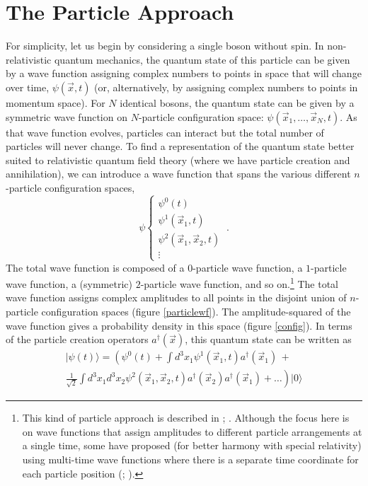 \documentclass[12pt,onecolumn,secnumarabic,amsmath,amssymb,balancelastpage,nofootinbib]{article}
\begin{document}
\section{The Particle Approach}\label{PARTICLEsection}

For simplicity, let us begin by considering a single boson without spin.  In non-relativistic quantum mechanics, the quantum state of this particle can be given by a wave function assigning complex numbers to points in space that will change over time, $\psi(\vec{x}, t)$ (or, alternatively, by assigning complex numbers to points in momentum space).  For $N$ identical bosons, the quantum state can be given by a symmetric wave function on $N$-particle configuration space: $\psi(\vec{x}_1, \dots, \vec{x}_N, t)$.  As that wave function evolves, particles can interact but the total number of particles will never change.  To find a representation of the quantum state better suited to relativistic quantum field theory (where we have particle creation and annihilation), we can introduce a wave function that spans the various different $n$-particle configuration spaces,
\begin{equation}
\psi \left\{ \begin{matrix}
\psi^{0}(t) \\
\psi^{1}(\vec{x}_1,t) \\
\psi^{2}(\vec{x}_1,\vec{x}_2,t) \\
\vdots
\end{matrix}
\right.\ .
\label{totalWFscalar}
\end{equation}
The total wave function is composed of a $0$-particle wave function, a $1$-particle wave function, a (symmetric) $2$-particle wave function, and so on.\footnote{This kind of particle approach is described in \citet[sec.\ 6f, 7c]{schweberQFT}; \citet{dgz2004, durr2005, tumulka2018}.  Although the focus here is on wave functions that assign amplitudes to different particle arrangements at a single time, some have proposed (for better harmony with special relativity) using multi-time wave functions where there is a separate time coordinate for each particle position (\citealp{lienert2017}; \citealp[ch.\ 4]{lienert2020}).}  The total wave function assigns complex amplitudes to all points in the disjoint union of $n$-particle configuration spaces (figure \ref{particlewf}).  The amplitude-squared of the wave function gives a probability density in this space (figure \ref{config}).  In terms of the particle creation operators $a^\dagger (\vec{x})$, this quantum state can be written as
\begin{multline}
| \psi (t) \rangle = \left(\psi^{0}(t) + \int d^3 x_1 \psi^{1}(\vec{x}_1,t) a^\dagger (\vec{x}_1) \,+ \right . \\ \left . \frac{1}{\sqrt{2}}\int d^3 x_1 d^3 x_2 \psi^{2}(\vec{x}_1,\vec{x}_2,t) a^\dagger (\vec{x}_2) a^\dagger (\vec{x}_1)+\dots \right)| 0 \rangle
\label{WFscalar}
\end{multline}
\end{document}
